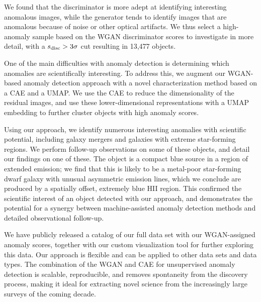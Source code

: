 We found that the discriminator is more adept at identifying interesting anomalous images, while the generator tends to identify images that are anomalous because of noise or other optical artifacts.
We thus select a high-anomaly sample based on the WGAN discriminator scores to investigate in more detail, with a $s_\mathrm{disc}>3\sigma$ cut resulting in 13,477 objects. 

One of the main difficulties with anomaly detection is determining which anomalies are scientifically interesting.
To address this, we augment our WGAN-based anomaly detection approach with a novel characterization method based on a CAE and a UMAP.
We use the CAE to reduce the dimensionality of the residual images, and use these lower-dimensional representations with a UMAP embedding to further cluster objects with high anomaly scores.

Using our approach, we identify numerous interesting anomalies with scientific potential, including galaxy mergers and galaxies with extreme star-forming regions.
We perform follow-up observations on some of these objects, and detail our findings on one of these.
The object is a compact blue source in a region of extended emission; we find that this is likely to be a metal-poor star-forming dwarf galaxy with unusual asymmetric emission lines, which we conclude are produced by a spatially offset, extremely blue HII region.
This confirmed the scientific interest of an object detected with our approach, and demonstrates the potential for a synergy between machine-assisted anomaly detection methods and detailed observational follow-up.

We have publicly released a catalog of our full data set with our WGAN-assigned anomaly scores, together with our custom visualization tool for further exploring this data.
Our approach is flexible and can be applied to other data sets and data types.
The combination of the WGAN and CAE for unsupervised anomaly detection is scalable, reproducible, and removes spontaneity from the discovery process, making it ideal for extracting novel science from the increasingly large surveys of the coming decade.

